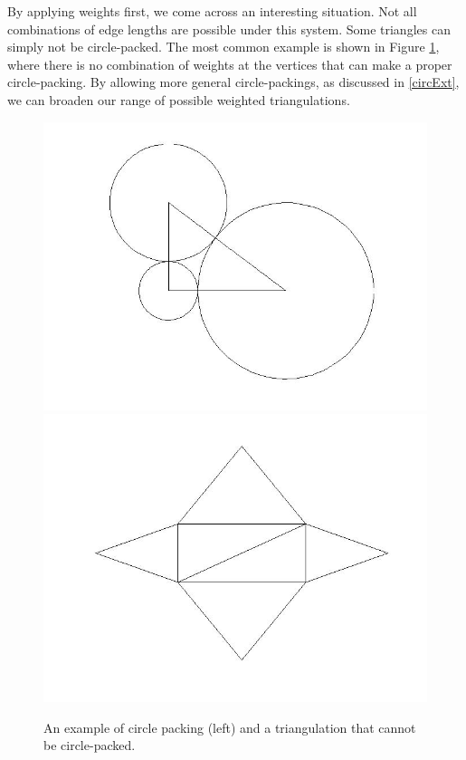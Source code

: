\documentclass[12pt]{article}
\begin{document}
\noindent By applying weights first, we come across an interesting situation. Not all combinations of edge lengths are possible under this system. Some triangles can simply not be circle-packed. The most common example is shown in Figure \ref{rightTri}, where there is no combination of weights at the vertices that can make a proper circle-packing. By allowing more general circle-packings, as discussed in \ref{circExt}, we can broaden our range of possible weighted triangulations.

  
\begin{figure}
\includegraphics[scale = 0.3]{righttriangulation.jpg}
\includegraphics[scale = 0.3]{badcase.jpg}
\caption{An example of circle packing (left) and a triangulation that cannot be circle-packed.}
\label{rightTri}
\end{figure}
\end{document}
